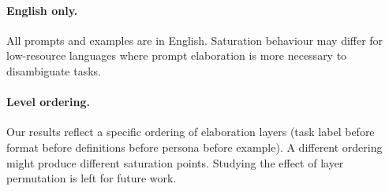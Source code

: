 \paragraph{English only.}
All prompts and examples are in English.
Saturation behaviour may differ for low-resource languages where prompt
elaboration is more necessary to disambiguate tasks.

\paragraph{Level ordering.}
Our results reflect a specific ordering of elaboration layers (task label
before format before definitions before persona before example).
A different ordering might produce different saturation points.
Studying the effect of layer permutation is left for future work.
